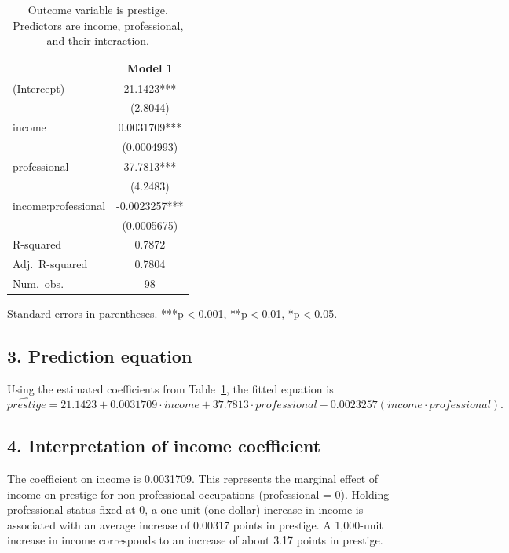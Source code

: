 \documentclass[12pt]{article}
\begin{document}
	\begin{table}[h!]
		\centering
		\caption{Outcome variable is prestige. Predictors are income,
			professional, and their interaction.}
		\label{tab:q1}
		\begin{tabular}{l c}
			\toprule
			& Model 1 \\
			\midrule
			(Intercept)               & 21.1423*** \\
			& (2.8044)   \\
			income                    & 0.0031709*** \\
			& (0.0004993) \\
			professional              & 37.7813*** \\
			& (4.2483)   \\
			income:professional       & -0.0023257*** \\
			& (0.0005675) \\
			\midrule
			R-squared                 & 0.7872     \\
			Adj.\ R-squared           & 0.7804     \\
			Num.\ obs.                & 98         \\
			\bottomrule
		\end{tabular}
		
		\begin{flushleft}
			{\footnotesize Standard errors in parentheses.
				***p$<$0.001, **p$<$0.01, *p$<$0.05.}
		\end{flushleft}
	\end{table}
	
	\subsection*{3. Prediction equation}
	
	Using the estimated coefficients from Table~\ref{tab:q1}, the fitted equation is
	\[
	\widehat{prestige} =
	21.1423
	+ 0.0031709 \cdot income
	+ 37.7813 \cdot professional
	- 0.0023257 (income \cdot professional).
	\]
	
	\subsection*{4. Interpretation of income coefficient}
	
	The coefficient on income is 0.0031709. This represents the marginal
	effect of income on prestige for non-professional occupations
	(professional = 0). Holding professional status fixed at 0, a one-unit
	(one dollar) increase in income is associated with an average increase of
	0.00317 points in prestige. A 1{,}000-unit increase in income
	corresponds to an increase of about 3.17 points in prestige.
	
\end{document}
